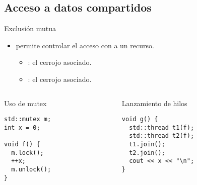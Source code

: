 \subsection{Acceso a datos compartidos}

\begin{frame}[t,fragile]{Exclusión mutua}
\begin{itemize}
  \item {} permite controlar el acceso con  a un recurso.
    \begin{itemize}
      \item {}:  el cerrojo asociado.
      \item {}:  el cerrojo asociado.
    \end{itemize}
\end{itemize}

\begin{columns}[T]
\begin{column}{.5\textwidth}
\begin{block}{Uso de mutex}
\begin{lstlisting}
std::mutex m;
int x = 0;

void f() {
  m.lock();
  ++x;
  m.unlock();
}
\end{lstlisting}
\end{block}
\end{column}

\begin{column}{.5\textwidth}
\begin{block}{Lanzamiento de hilos}
\begin{lstlisting}
void g() {
  std::thread t1(f); 
  std::thread t2(f);
  t1.join(); 
  t2.join();
  cout << x << "\n";
}
\end{lstlisting}
\end{block}
\end{column}
\end{columns}
\end{frame}


